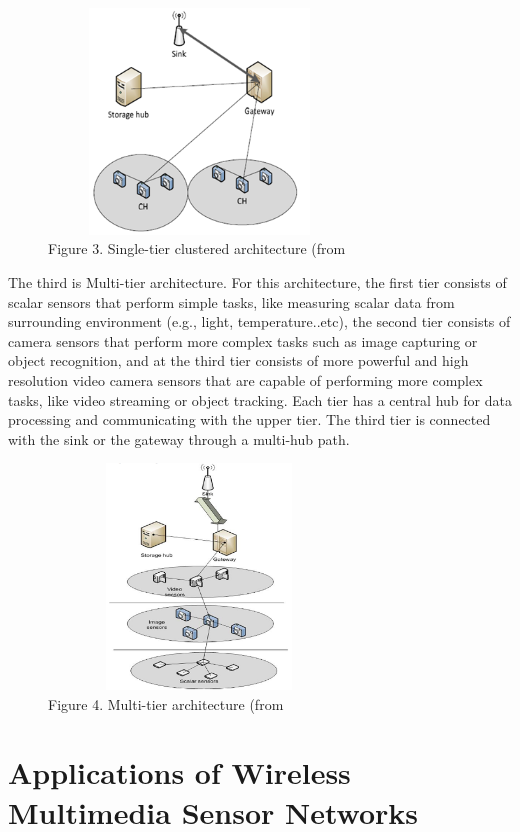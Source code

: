 \documentclass[conference]{IEEEtran}
\begin{document}
\begin{figure}
    \includegraphics[width=8cm, height=6cm]{images/p3.png}
    \centering
    \caption{Figure 3. Single-tier clustered architecture (from \citet{Inaf02}}
\end{figure}

\par \indent The third is Multi-tier architecture. For this architecture, the first tier consists of scalar sensors that perform simple tasks, like measuring scalar data from surrounding environment (e.g., light, temperature..etc), the second tier consists of camera sensors that perform more complex tasks such as image capturing or object recognition, and at the third tier consists of more powerful and high resolution video camera sensors that are capable of performing more complex tasks, like video streaming or object tracking. Each tier has a central hub for data processing and communicating with the upper tier. The third tier is connected with the sink or the gateway through a multi-hub path.

\begin{figure}
    \includegraphics[width=8cm, height=6cm]{images/p4.png}
    \centering
    \caption{Figure 4. Multi-tier architecture (from \citet{Inaf02}}
\end{figure}


\section{Applications of Wireless Multimedia Sensor Networks}
\end{document}
